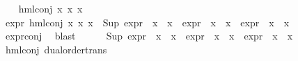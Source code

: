 \begin{isabellebody}
\isamarkupfalse%
\isanewline
\ \ \isamarkupfalse%
\ {\isacharparenleft}{\kern0pt}hml{\isacharunderscore}{\kern0pt}conj\ x{}\ x{}\ x{}{\isacharparenright}{\kern0pt}\isanewline
\ \ \isamarkupfalse%
\ {\isachardoublequoteopen}expr{\isacharunderscore}{\kern0pt}{}\ {\isacharparenleft}{\kern0pt}hml{\isacharunderscore}{\kern0pt}conj\ x{}\ x{}\ x{}{\isacharparenright}{\kern0pt}\ {\isacharequal}{\kern0pt}\ {\isacharparenleft}{\kern0pt}Sup\ {\isacharparenleft}{\kern0pt}{\isacharparenleft}{\kern0pt}expr{\isacharunderscore}{\kern0pt}{}\ {\isasymcirc}\ x{}{\isacharparenright}{\kern0pt}\ {\isacharbackquote}{\kern0pt}\ x{}\ {\isasymunion}\ {\isacharparenleft}{\kern0pt}expr{\isacharunderscore}{\kern0pt}{}\ {\isasymcirc}\ x{}{\isacharparenright}{\kern0pt}\ {\isacharbackquote}{\kern0pt}\ x{}\ {\isasymunion}\ {\isacharparenleft}{\kern0pt}expr{\isacharunderscore}{\kern0pt}{}\ {\isasymcirc}\ x{}{\isacharparenright}{\kern0pt}\ {\isacharbackquote}{\kern0pt}\ x{}{\isacharparenright}{\kern0pt}{\isacharparenright}{\kern0pt}{\isachardoublequoteclose}\isanewline
\ \ \ \ \isamarkupfalse%
\ expr{\isacharunderscore}{\kern0pt}{}{\isacharunderscore}{\kern0pt}conj\ \isamarkupfalse%
\ blast\isanewline
\ \ \isamarkupfalse%
\ {\isachardoublequoteopen}{}\ {\isasymle}\ {\isacharparenleft}{\kern0pt}Sup\ {\isacharparenleft}{\kern0pt}{\isacharparenleft}{\kern0pt}expr{\isacharunderscore}{\kern0pt}{}\ {\isasymcirc}\ x{}{\isacharparenright}{\kern0pt}\ {\isacharbackquote}{\kern0pt}\ x{}\ {\isasymunion}\ {\isacharparenleft}{\kern0pt}expr{\isacharunderscore}{\kern0pt}{}\ {\isasymcirc}\ x{}{\isacharparenright}{\kern0pt}\ {\isacharbackquote}{\kern0pt}\ x{}\ {\isasymunion}\ {\isacharparenleft}{\kern0pt}expr{\isacharunderscore}{\kern0pt}{}\ {\isasymcirc}\ x{}{\isacharparenright}{\kern0pt}\ {\isacharbackquote}{\kern0pt}\ x{}{\isacharparenright}{\kern0pt}{\isacharparenright}{\kern0pt}{\isachardoublequoteclose}\isanewline
\ \ \ \ \isamarkupfalse%
\ hml{\isacharunderscore}{\kern0pt}conj{\isacharparenleft}{\kern0pt}{}{\isacharparenright}{\kern0pt}\ dual{\isacharunderscore}{\kern0pt}order{\isachardot}{\kern0pt}trans\ \isanewline
\ \ \ \ \isamarkupfalse%

\end{isabellebody}
